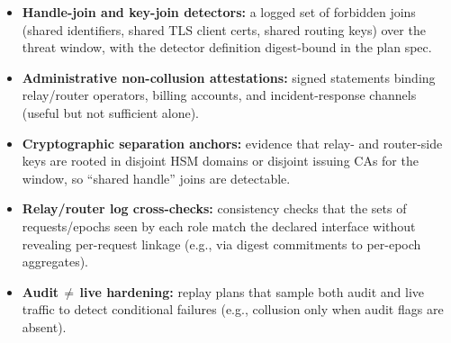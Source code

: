 \documentclass[11pt]{article}
\begin{document}
\begin{itemize}[leftmargin=*]
\item \textbf{Handle-join and key-join detectors:} a logged set of forbidden joins (shared identifiers, shared TLS client certs, shared routing keys) over the threat window, with the detector definition digest-bound in the plan spec.
\item \textbf{Administrative non-collusion attestations:} signed statements binding relay/router operators, billing accounts, and incident-response channels (useful but not sufficient alone).
\item \textbf{Cryptographic separation anchors:} evidence that relay- and router-side keys are rooted in disjoint HSM domains or disjoint issuing CAs for the window, so ``shared handle'' joins are detectable.
\item \textbf{Relay/router log cross-checks:} consistency checks that the sets of requests/epochs seen by each role match the declared interface without revealing per-request linkage (e.g., via digest commitments to per-epoch aggregates).
\item \textbf{Audit$\,\neq\,$live hardening:} replay plans that sample both audit and live traffic to detect conditional failures (e.g., collusion only when audit flags are absent).
\end{itemize}
\end{document}
